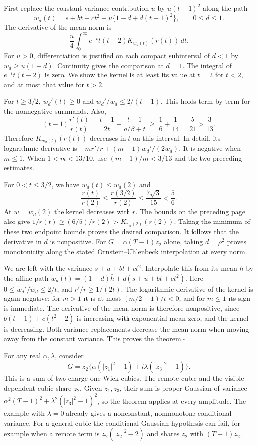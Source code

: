 \documentclass[11pt]{article}
\newcommand{\heading}[1]{\par\smallskip{\large\bfseries\color{ink}#1}\par\smallskip}
\newcommand{\subhead}[1]{\par\smallskip{\bfseries\color{ink}#1}\enspace}
\newcommand{\qed}{\hfill\(\square\)}
\begin{document}
\newpage
\heading{Proof of the comparison}
First replace the constant variance contribution \(u\) by \(u(t-1)^2\) along the path
\[
 w_d(t)=s+bt+ct^2+u\{1-d+d(t-1)^2\},\qquad 0\le d\le1.
\]
The derivative of the mean norm is
\[
 \frac u4\int_0^\infty e^{-t}t(t-2)K_{w_d(t)}(r(t))\,dt .
\]
For \(u>0\), differentiation is justified on each compact subinterval of \(d<1\)
by \(w_d\ge u(1-d)\). Continuity gives the comparison at \(d=1\).
The integral of \(e^{-t}t(t-2)\) is zero. We show the kernel is at least its value
at \(t=2\) for \(t<2\), and at most that value for \(t>2\).

For \(t\ge3/2\), \(w_d'(t)\ge0\) and \(w_d'/w_d\le 2/(t-1)\). This holds term by
term for the nonnegative summands. Also,
\[
 (t-1)\frac{r'(t)}{r(t)}
 =\frac{t-1}{2t}+\frac{t-1}{a/\beta+t}
 \ \ge\ \frac16+\frac1{14}=\frac5{21}>\frac3{13}.
\]
Therefore \(K_{w_d(t)}(r(t))\) decreases in \(t\) on this interval. In detail, its
logarithmic derivative is \(-m r'/r+(m-1)w_d'/(2w_d)\). It is negative when \(m\le1\).
When \(1<m<13/10\), use \((m-1)/m<3/13\) and the two preceding estimates.

For \(0<t\le3/2\), we have \(w_d(t)\le w_d(2)\) and
\[
 \frac{r(t)}{r(2)}\le\frac{r(3/2)}{r(2)}
 \le\frac{7\sqrt3}{15}<\frac56 .
\]
At \(w=w_d(2)\) the kernel decreases with \(r\). The bounds on the preceding page
also give \(1/r(t) \ge (6/5)/r(2)>K_{w_d(2)}(r(2))\). Taking the minimum of these
two endpoint bounds proves the desired comparison. It follows that the derivative
in \(d\) is nonpositive. For \(G=\alpha(T-1)z_2\) alone, taking \(d=\rho^2\) proves
monotonicity along the stated Ornstein--Uhlenbeck interpolation at every norm.

We are left with the variance \(s+u+bt+ct^2\). Interpolate this from its mean
\(\bar h\) by the affine path
\(\widetilde w_d(t)=(1-d)\bar h+d(s+u+bt+ct^2)\).
Here \(0\le\widetilde w_d'/\widetilde w_d\le2/t\), and \(r'/r\ge1/(2t)\).
The logarithmic derivative of the kernel is again negative: for \(m>1\) it is
at most \((m/2-1)/t<0\), and for \(m\le1\) its sign is immediate.
The derivative of the mean norm is therefore nonpositive, since
\(b(t-1)+c(t^2-2)\) is increasing with exponential mean zero, and the kernel is
decreasing. Both variance replacements decrease the mean norm when moving away
from the constant variance. This proves the theorem.\qed

\subhead{A shared remote coordinate.}
For any real \(\alpha,\lambda\), consider
\[
 G=z_2\{\alpha(|z_1|^2-1)+i\lambda(|z_3|^2-1)\}.
\]
This is a sum of two charge-one Wick cubics. The remote cubic and the visible-dependent
cubic share \(z_2\). Given \(z_1,z_3\), their sum is proper Gaussian of variance
\(\alpha^2(T-1)^2+\lambda^2(|z_3|^2-1)^2\), so the theorem applies at every amplitude.
The example with \(\lambda=0\) already gives a nonconstant, nonmonotone conditional
variance. For a general cubic the conditional Gaussian hypothesis can fail, for example
when a remote term is \(z_2(|z_2|^2-2)\) and shares \(z_2\) with \((T-1)z_2\).
\end{document}
